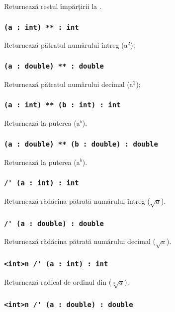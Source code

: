 Returnează restul împărțirii  la .


\subsubsection{\lstinline|(a : int) ** : int|}

Returnează pătratul numărului întreg  (a$^2$);

\subsubsection{\lstinline|(a : double) ** : double|}

Returnează pătratul numărului decimal  (a$^2$);

\subsubsection{\lstinline|(a : int) ** (b : int) : int|}

Returnează  la puterea  (a$^b$).

\subsubsection{\lstinline|(a : double) ** (b : double) : double|}

Returnează  la puterea  (a$^b$).

\subsubsection{\lstinline|/' (a : int) : int|}

Returnează rădăcina pătrată numărului întreg  ($\sqrt{a}$).

\subsubsection{\lstinline|/' (a : double) : double|}

Returnează rădăcina pătrată numărului decimal  ($\sqrt{a}$).

\subsubsection{\lstinline|<int>n /' (a : int) : int|}

Returnează radical de ordinul  din  ($\sqrt[n]{a}$).

\subsubsection{\lstinline|<int>n /' (a : double) : double|}

